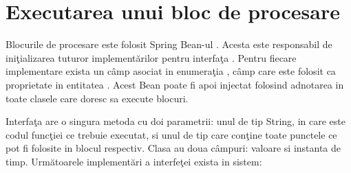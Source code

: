 \section{Executarea unui bloc de procesare}
Blocurile de procesare este folosit Spring Bean-ul . Acesta este responsabil de iniţializarea tuturor implementărilor pentru interfaţa . Pentru fiecare implementare exista un câmp asociat in enumeraţia , câmp care este folosit ca proprietate in entitatea . Acest Bean poate fi apoi injectat folosind adnotarea  in toate clasele care doresc sa execute blocuri.

Interfaţa  are o singura metoda  cu doi parametrii: unul de tip String, in care este codul funcţiei ce trebuie executat, si unul de tip  care conţine toate punctele ce pot fi folosite in blocul respectiv. Clasa  au doua câmpuri: valoare si instanta de timp. Următoarele implementări a interfeţei  exista in sistem:
